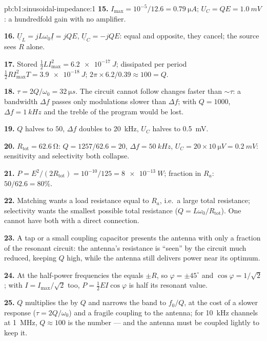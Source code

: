 \begin{solution}{pb:b1:sinusoidal-impedance:1}
\textbf{15.} $I_{\max} = 10^{-5}/12.6 = \qty{0.79}{\micro A}$; $U_C = QE =
\qty{1.0}{mV}$: a hundredfold  gain with no amplifier.

\textbf{16.} $\underline U_L = jL\omega_0\underline I = jQE$, $\underline U_C
= -jQE$: equal and opposite, they cancel; the source sees $R$ alone.

\textbf{17.} Stored $\tfrac12 LI_{\max}^2 = \qty{6.2e-17}{J}$; dissipated
per period $\tfrac12 RI_{\max}^2T = \qty{3.9e-18}{J}$; $2\pi \times 6.2/0.39
\approx 100 = Q$.

\textbf{18.} $\tau = 2Q/\omega_0 = \qty{32}{\micro s}$. The circuit cannot
follow changes faster than $\sim\tau$: a bandwidth $\Delta f$ passes
only modulations slower than $\Delta f$; with $Q = 1000$, $\Delta f =
\qty{1}{kHz}$ and the treble of the program would be lost.

\textbf{19.} $Q$ halves to $50$, $\Delta f$ doubles to \qty{20}{kHz}, $U_C$
halves to \qty{0.5}{mV}.

\textbf{20.} $R_{\text{tot}} = \qty{62.6}{\ohm}$: $Q = 1257/62.6 = 20$,
$\Delta f = \qty{50}{kHz}$, $U_C = 20 \times \qty{10}{\micro V} = \qty{0.2}{mV}$:
sensitivity and selectivity both collapse.

\textbf{21.} $P = E^2/(2R_{\text{tot}}) = 10^{-10}/125 = \qty{8e-13}{W}$;
fraction in $R_a$: $50/62.6 = 80\%$.

\textbf{22.} Matching wants a load resistance equal to $R_a$, i.e.\ a
large total resistance; selectivity wants the smallest possible total
resistance ($Q = L\omega_0/R_{\text{tot}}$). One cannot have both with a
direct connection.

\textbf{23.} A tap or a small coupling capacitor presents the antenna
with only a fraction of the resonant circuit: the antenna's resistance
is ``seen'' by the circuit much reduced, keeping $Q$ high, while the
antenna still delivers power near its optimum.

\textbf{24.} At the half-power frequencies the  equals $\pm R$,
so $\varphi = \pm45^\circ$ and $\cos\varphi = 1/\sqrt2$; with $I =
I_{\max}/\sqrt2$ too, $P = \tfrac12 EI\cos\varphi$ is half its resonant
value.

\textbf{25.} $Q$ multiplies the  by $Q$ and narrows the band to
$f_0/Q$, at the cost of a slower response ($\tau = 2Q/\omega_0$) and a
fragile coupling to the antenna; for \qty{10}{kHz} channels at
\qty{1}{MHz}, $Q \approx 100$ is the number --- and the antenna must be
coupled lightly to keep it.
\end{solution}

